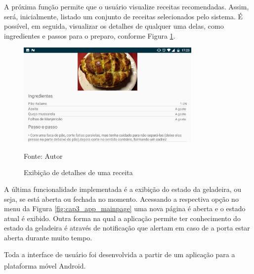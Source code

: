 A próxima função permite que o usuário visualize receitas recomendadas. Assim, será, inicialmente, listado um conjunto de receitas selecionados pelo sistema. É possível, em seguida, visualizar os detalhes de qualquer uma delas, como ingredientes e passos para o preparo, conforme Figura \ref{fig:cap4_exibicao_receita}.

\begin{figure}[htb]
    \caption{Exibição de detalhes de uma receita}
    \label{fig:cap4_exibicao_receita}
    \includegraphics[width=0.8\textwidth]{figuras/cap4_exibicao_receita.png}
    
   \footnotesize{Fonte: Autor}
\end{figure}

A última funcionalidade implementada é a exibição do estado da geladeira, ou seja, se está aberta ou fechada no momento. Acessando a respectiva opção no menu da Figura \ref{fig:cap3_app_mainpage} uma nova página é aberta e o estado atual é exibido. Outra forma na qual a aplicação permite ter conhecimento do estado da geladeira é através de notificação que alertam em caso de a porta estar aberta durante muito tempo.

Toda a interface de usuário foi desenvolvida a partir de um aplicação para a plataforma móvel Android\textsuperscript{\textregistered}.



